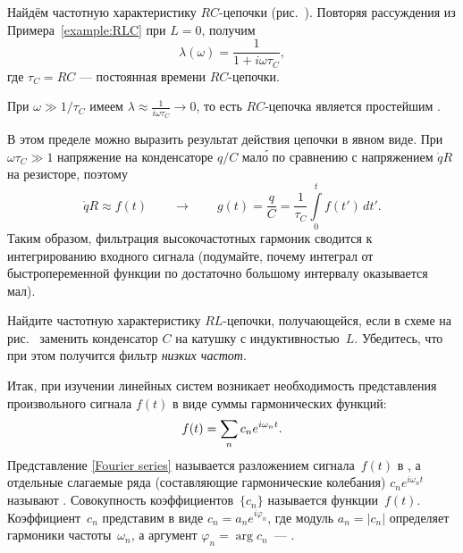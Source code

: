 \begin{lab:example}\label{example:RC}
Найдём частотную характеристику $RC$-цепочки (рис.~).
Повторяя рассуждения из Примера~\ref{example:RLC} при $L=0$, получим
\begin{equation*}
\lambda(\omega) = \frac{1}{1+i\omega \tau_C},
\end{equation*}
где $\tau_C=RC$ --- постоянная времени $RC$-цепочки.

При $\omega \gg 1/\tau_C$ имеем $\lambda \approx \frac{1}{i\omega\tau_C} \to 0$,
то есть $RC$-цепочка является простейшим .

В этом пределе можно выразить результат действия цепочки в явном виде.
При $\omega\tau_C\gg1$ напряжение на конденсаторе $q/C$ мал\'{о} по сравнению
с напряжением $\dot{q}R$ на резисторе, поэтому
\begin{equation*}
\dot{q} R \approx f(t) \qquad \to \qquad g(t) = \frac{q}{C} = \frac{1}{\tau_C}\int\limits_0^t f(t')\,dt'.
\end{equation*}
Таким образом, фильтрация высокочастотных гармоник сводится к интегрированию
входного сигнала (подумайте, почему интеграл от быстропеременной функции
по достаточно большому интервалу оказывается мал).
\end{lab:example}

\begin{lab:exercise}
    Найдите частотную характеристику $RL$-цепочки,
    получающейся, если в схеме на рис.~ заменить конденсатор $C$
    на катушку с индуктивностью~$L$. Убедитесь, что при этом
    получится фильтр \emph{низких частот}.
\end{lab:exercise}

\label{sec:spectrum}

Итак, при изучении линейных систем возникает необходимость
представления произвольного сигнала $f(t)$ в виде
суммы гармонических функций:
\begin{equation}
    \eqmark{Fourier series}
    f(t)=\sum\limits_n c_n e^{i\omega_n t}.
\end{equation}
Представление \eqref{Fourier series} называется разложением сигнала~$f(t)$ в
, а отдельные слагаемые ряда (составляющие
гармонические колебания) $c_n e^{i\omega_n t}$ называют .
Совокупность коэффициентов~$\{c_n\}$ называется  функции~$f(t)$.
Коэффициент~$c_n$ представим в виде $c_n=a_ne^{i\varphi_n}$, где
модуль $a_n=|c_n|$ определяет  гармоники частоты~$\omega_n$,
а аргумент $\varphi_n=\arg c_n$~--- .

